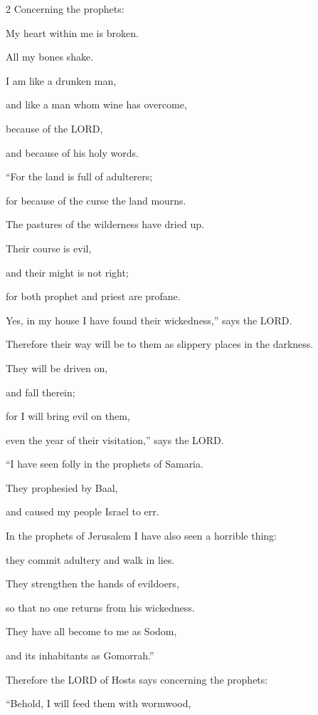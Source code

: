 \begin{multicols}{2}
\myverse{}Concerning the prophets:

My heart within me is broken.

All my bones shake.

I am like a drunken man,

and like a man whom wine has overcome,

because of the LORD,

and because of his holy words.


\myverse{}“For the land is full of adulterers;

for because of the curse the land mourns.

The pastures of the wilderness have dried up.

Their course is evil,

and their might is not right;


\myverse{}for both prophet and priest are profane.

Yes, in my house I have found their wickedness,” says the LORD.


\myverse{}Therefore their way will be to them as slippery places in the
darkness.

They will be driven on,

and fall therein;

for I will bring evil on them,

even the year of their visitation,” says the LORD.

\vspace{\baselineskip}

\myverse{}“I have seen folly in the prophets of Samaria.

They prophesied by Baal,

and caused my people Israel to err.


\myverse{}In the prophets of Jerusalem I have also seen a horrible thing:

they commit adultery and walk in lies.

They strengthen the hands of evildoers,

so that no one returns from his wickedness.

They have all become to me as Sodom,

and its inhabitants as Gomorrah.”


\myverse{}Therefore the LORD of Hosts says concerning the prophets:

“Behold, I will feed them with wormwood,


\end{multicols}
